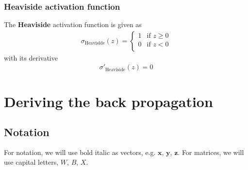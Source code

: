 \documentclass[a4paper,10pt]{article}
\begin{document}
\subsubsection{Heaviside activation function}
The \textbf{Heaviside} activation function is given as
\begin{align}
    \sigma_\mathrm{Heaviside}(z) = 
    \begin{cases}
        1 & \text{if } z \geq 0 \\
        0 & \text{if } z < 0 \\
    \end{cases}
    \label{eq:act-heaviside}
\end{align}
with its derivative
\begin{align}
    \sigma'_\mathrm{Heaviside}(z) = 0
    \label{eq:act-heaviside-der}
\end{align}


\section{Deriving the back propagation}




\begin{appendices}
\section{Notation} \label{app:notation}
For notation, we will use bold italic as vectors, e.g. $\bm{x}$, $\bm{y}$, $\bm{z}$. For matrices, we will use capital letters, $W$, $B$, $X$.
\end{appendices}
\end{document}
